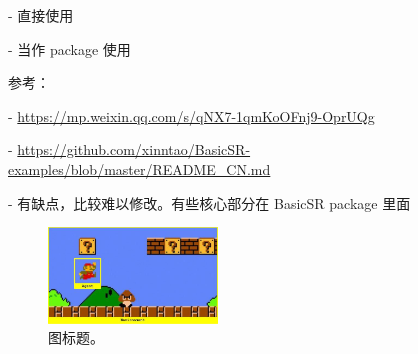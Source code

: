 \documentclass[../main.tex]{subfiles}
\begin{document}
- 直接使用

- 当作 package 使用

参考：

- \url{https://mp.weixin.qq.com/s/qNX7-1qmKoOFnj9-OprUQg}

- \url{https://github.com/xinntao/BasicSR-examples/blob/master/README_CN.md}

- 有缺点，比较难以修改。有些核心部分在 BasicSR package 里面

\begin{figure}
	\centering
	\includegraphics[width=0.4\textwidth]{figures/agentenv.png}
	\vspace{-0.6cm}
	\caption{图标题。}
	\label{fig:env}
\end{figure}
\end{document}
